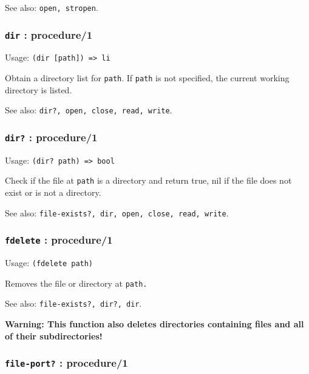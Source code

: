 \documentclass[
]{article}
\newcommand{\passthrough}[1]{#1}
\begin{document}
See also: \passthrough{\lstinline!open, stropen!}.

\hypertarget{dir-procedure1}{%
\subsubsection{\texorpdfstring{\texttt{dir} :
procedure/1}{dir : procedure/1}}\label{dir-procedure1}}

Usage: \passthrough{\lstinline!(dir [path]) => li!}

Obtain a directory list for \passthrough{\lstinline!path!}. If
\passthrough{\lstinline!path!} is not specified, the current working
directory is listed.

See also: \passthrough{\lstinline!dir?, open, close, read, write!}.

\hypertarget{dir-procedure1-1}{%
\subsubsection{\texorpdfstring{\texttt{dir?} :
procedure/1}{dir? : procedure/1}}\label{dir-procedure1-1}}

Usage: \passthrough{\lstinline!(dir? path) => bool!}

Check if the file at \passthrough{\lstinline!path!} is a directory and
return true, nil if the file does not exist or is not a directory.

See also:
\passthrough{\lstinline!file-exists?, dir, open, close, read, write!}.

\hypertarget{fdelete-procedure1}{%
\subsubsection{\texorpdfstring{\texttt{fdelete} :
procedure/1}{fdelete : procedure/1}}\label{fdelete-procedure1}}

Usage: \passthrough{\lstinline!(fdelete path)!}

Removes the file or directory at \passthrough{\lstinline!path.!}

See also: \passthrough{\lstinline!file-exists?, dir?, dir!}.

\textbf{Warning: This function also deletes directories containing files
and all of their subdirectories!}

\hypertarget{file-port-procedure1}{%
\subsubsection{\texorpdfstring{\texttt{file-port?} :
procedure/1}{file-port? : procedure/1}}\label{file-port-procedure1}}
\end{document}
